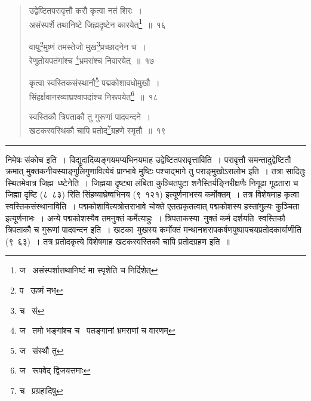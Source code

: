 \documentclass[11pt, openany]{book}
\begin{document}
\begin{quote}
{\na उद्वेष्टितपरावृत्तौ करौ कृत्वा नतं शिरः~।\\
असंस्पर्शे तथानिष्टे जिह्मदृष्टेन कारयेत्\renewcommand{\thefootnote}{1}\footnote{ज \textendash\  असंस्पर्शात्तथानिष्टं मा स्पृशेति च निर्दिशेत्}~॥~१६

वायु\renewcommand{\thefootnote}{2}\footnote{प \textendash\  ऊष्मं नभ}मुष्णं तमस्तेजो मुख\renewcommand{\thefootnote}{3}\footnote{च \textendash\  सं}प्रच्छादनेन च~।\\
रेणुतोयपतंगांश्च \renewcommand{\thefootnote}{4}\footnote{ज \textendash\  तमो भङ्गांश्च च \textendash\  पतङ्गानां भ्रमराणां च वारणम्}भ्रमरांश्च निवारयेत्~॥~१७

कृत्वा स्वस्तिकसंस्थानौ\renewcommand{\thefootnote}{5}\footnote{ज \textendash\  संस्थौ तु} पद्मकोशावधोमुखौ~।\\
सिंहर्क्षवानरव्याघ्रश्वापदांश्च निरूपयेत्\renewcommand{\thefootnote}{6}\footnote{ज \textendash\  रूपवेद् द्विजयत्तमाः}~॥~१८

स्वस्तिकौ त्रिपताकौ तु गुरूणां पादवन्दने~।\\
खटकस्वस्थिकौ चापि प्रतोद\renewcommand{\thefootnote}{7}\footnote{च \textendash\  प्रग्रहादिषु}ग्रहणे स्मृतौ~॥~१९}
\end{quote}

\hrule

\vspace{2mm}
\noindent
निमेषः संकोच इति~। विद्युदादिव्यङ्गयमप्यभिनयमाह उद्वेष्टितपरावृत्ताविति~। परावृत्तौ समन्तादुद्वेष्टितौ क्रमात् मुक्तकनीयस्याङ्गुलिगुणावित्येवं प्राग्भावे मुष्टिः पश्चाद्भागे तु पराङ्मुखोऽरालोभ इति~। तत्रा सादितुः स्थितमेवात्र जिह्म\textendash\ ध्ष्टेनेति~। जिह्मया दृष्ट्या {\qt लंबिता कुञ्चितपुटा शनैस्तिर्यङ्निरीक्षणैः निगूढा गूढतारा च जिह्मा दृष्टि} (८\textendash\ ८३) रिति {\qt सिंहव्याघ्रेष्वभिनय} (९\textendash\ १२१) इत्यूर्णनाभस्य कर्मोक्तम्~। तत्र विशेषमाह कृत्वा स्वस्तिकसंस्थानाविति~। पद्मकोशावित्यत्रोत्तराभावे चोक्ते एतत्प्रकृतत्वात् {\qt पद्मकोशस्य हस्तांगुल्यः कुञ्चिता} इत्यूर्णनाभः~। अन्ये पद्मकोशस्यैव तमनुक्तं कर्मेत्याहुः~। त्रिपताकस्या\textendash\ नुक्तं कर्म दर्शयति\textendash\ स्वस्तिकौ त्रिपताकौ च गुरूणां पादवन्दन इति~। खटका\textendash\ मुखस्य कर्मोक्तं {\qt मन्थानशरापकर्षणपुष्पापचयप्रतोदकार्याणीति} (९\textendash\ ६३)~। तत्र प्रतोदकृत्ये विशेषमाह खटकस्वस्तिकौ चापि प्रतोदग्रहण इति~॥

\newpage
\end{document}
